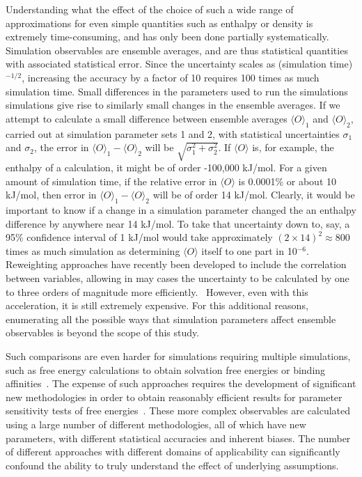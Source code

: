 Understanding what the effect of the choice of such a wide range of
approximations for even simple quantities such as enthalpy or density
is extremely time-consuming, and has only been done partially
systematically. Simulation observables are ensemble averages, and are
thus statistical quantities with associated statistical error. Since
the uncertainty scales as (simulation time)$^{-1/2}$, increasing the
accuracy by a factor of 10 requires 100 times as much simulation
time. Small differences in the parameters used to run the simulations
simulations give rise to similarly small changes in the ensemble
averages. If we attempt to calculate a small difference between
ensemble averages $\langle O \rangle_1$ and $\langle O \rangle_2$,
carried out at simulation parameter sets 1 and 2, with statistical
uncertainties $\sigma_1$ and $\sigma_2$, the error in $\langle O
\rangle_1 - \langle O \rangle_2$ will be
$\sqrt{\sigma_1^2+\sigma_2^2}$. If $\langle O \rangle$ is, for
example, the enthalpy of a calculation, it might be of order -100,000
kJ/mol.  For a given amount of simulation time, if the relative error
in $\langle O \rangle$ is 0.0001\% or about 10 kJ/mol, then error in
$\langle O\rangle_1 - \langle O \rangle_2$ will be of order 14
kJ/mol. Clearly, it would be important to know if a change in a
simulation parameter changed the an enthalpy difference by anywhere
near 14 kJ/mol. To take that uncertainty down to, say, a 95\%
confidence interval of 1 kJ/mol would take approximately $(2\times
14)^2 \approx 800$ times as much simulation as determining $\langle O
\rangle$ itself to one part in 10$^{-6}$.  Reweighting approaches have
recently been developed to include the correlation between variables,
allowing in may cases the uncertainty to be calculated by one to three
orders of magnitude more efficiently.~\cite{Paliwal2013} However, even
with this acceleration, it is still extremely expensive. For this
additional reasons, enumerating all the possible ways that simulation
parameters affect ensemble observables is beyond the scope of this
study.

Such comparisons are even harder for simulations requiring multiple
simulations, such as free energy calculations to obtain solvation free
energies or binding affinities~\cite{???}.  The expense of such
approaches requires the development of significant new methodologies
in order to obtain reasonably efficient results for parameter
sensitivity tests of free energies~\cite{naden_rapid_2016}. These more
complex observables are calculated using a large number of different
methodologies, all of which have new parameters, with different
statistical accuracies and inherent biases. The number of different
approaches with different domains of applicability can significantly
confound the ability to truly understand the effect of underlying
assumptions.

